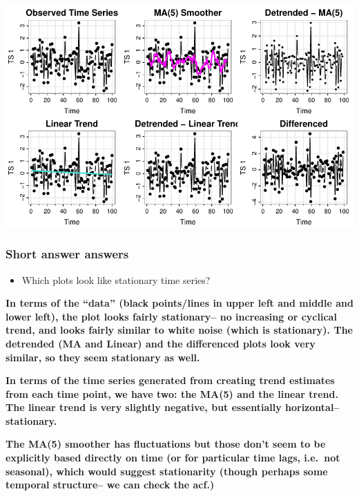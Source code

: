 \documentclass[
  letterpaper,
  DIV=11,
  numbers=noendperiod]{scrartcl}
\providecommand{\tightlist}{%
  \setlength{\itemsep}{0pt}\setlength{\parskip}{0pt}}\usepackage{longtable,booktabs,array}
\begin{document}
\includegraphics{Lecture7_files/figure-pdf/all_parts-1.pdf}

\subsubsection{Short answer answers}\label{short-answer-answers}

\begin{itemize}
\tightlist
\item
  Which plots look like stationary time series?
\end{itemize}

\textbf{In terms of the ``data'' (black points/lines in upper left and
middle and lower left), the plot looks fairly stationary-- no increasing
or cyclical trend, and looks fairly similar to white noise (which is
stationary). The detrended (MA and Linear) and the differenced plots
look very similar, so they seem stationary as well.}

\textbf{In terms of the time series generated from creating trend
estimates from each time point, we have two: the MA(5) and the linear
trend. The linear trend is very slightly negative, but essentially
horizontal-- stationary.}

\textbf{The MA(5) smoother has fluctuations but those don't seem to be
explicitly based directly on time (or for particular time lags, i.e.~not
seasonal), which would suggest stationarity (though perhaps some
temporal structure-- we can check the acf.)}
\end{document}

